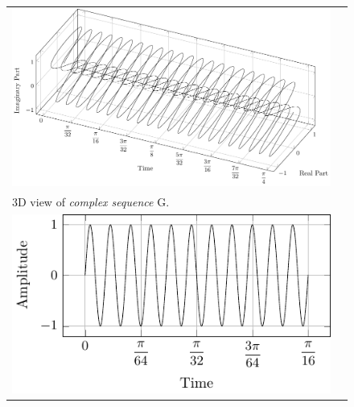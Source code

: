 \documentclass[../../course]{subfiles}
\begin{document}
\begin{figure} [H]

    \renewcommand{\arraystretch}{0.75}
    \centering
    \begin{NiceTabularX} {\textwidth} {
            *{2}{>{\centering\arraybackslash}X}
        }

         {
             {
                \includegraphics[height = \textheight] {tikzpics/plotComplexG.pdf}
            }
        }

        &
        \\

         {
            \vbox{
                 {3D view of \emph{complex sequence} G.}
                \label{plt:cmplxG}
            }
        }

        &
        \\

         {
             {
                \includegraphics[height = \textheight] {tikzpics/plotShortX3.pdf}
            }
        }

        &


\end{NiceTabularX}
\end{figure}
\end{document}
